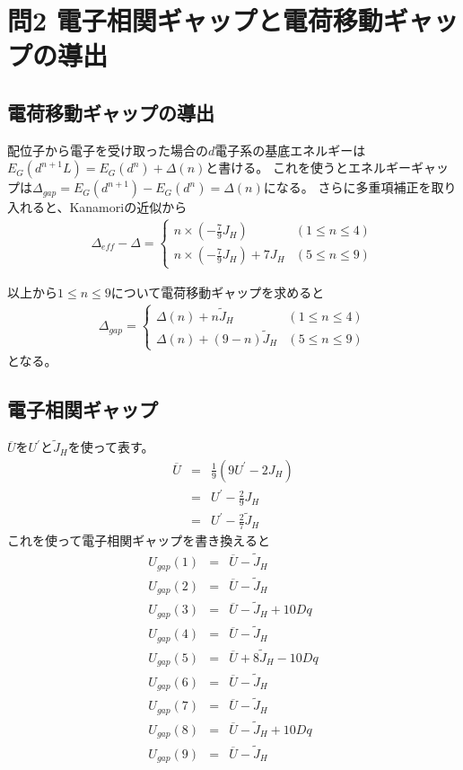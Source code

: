 \documentclass{jsarticle}
\begin{document}
\section{問2 電子相関ギャップと電荷移動ギャップの導出}

\subsection{電荷移動ギャップの導出}
配位子から電子を受け取った場合の$d$電子系の基底エネルギーは$E_G(d^{n+1}L)=E_G(d^n)+\Delta(n)$と書ける。
これを使うとエネルギーギャップは$ \Delta _{gap} = E_G(d^{n+1})-E_G(d^{n})= \Delta (n)$になる。
さらに多重項補正を取り入れると、Kanamoriの近似から
\begin{eqnarray}
  \Delta _{eff} - \Delta
  = \left\{ \begin{array}{ll}
    n \times (- \frac{7}{9} J_H) & (1 \leq n \leq 4) \\
    n \times (- \frac{7}{9} J_H) + 7 J_H & (5 \leq n \leq 9)
  \end{array} \right. \nonumber
\end{eqnarray}

以上から$1 \leq n \leq 9$について電荷移動ギャップを求めると
\begin{eqnarray}
  \Delta _{gap}
  = \left\{ \begin{array}{ll}
    \Delta(n) + n \tilde{J}_H & (1 \leq n \leq 4) \\
    \Delta(n) + (9 - n) \tilde{J}_H & (5 \leq n \leq 9)
  \end{array} \right. \nonumber
\end{eqnarray}
となる。

\subsection{電子相関ギャップ}
$\overline{U}$を$U^{\prime}$と$\tilde{J}_H$を使って表す。
\begin{eqnarray}
  \overline{U} &=& \frac{1}{9} (9U^{\prime} -2J_H) \nonumber \\
  &=& U^{\prime} - \frac{2}{9}J_H \nonumber \\
  &=& U^{\prime} - \frac{2}{7}\tilde{J}_H \nonumber
\end{eqnarray}
これを使って電子相関ギャップを書き換えると
\begin{eqnarray}
  U_{gap}(1) &=& \overline{U} - \tilde{J}_H \nonumber \\
  U_{gap}(2) &=& \overline{U} - \tilde{J}_H \nonumber \\
  U_{gap}(3) &=& \overline{U} - \tilde{J}_H + 10Dq \nonumber \\
  U_{gap}(4) &=& \overline{U} - \tilde{J}_H \nonumber \\
  U_{gap}(5) &=& \overline{U} + 8\tilde{J}_H - 10Dq \nonumber \\
  U_{gap}(6) &=& \overline{U} - \tilde{J}_H \nonumber \\
  U_{gap}(7) &=& \overline{U} - \tilde{J}_H \nonumber \\
  U_{gap}(8) &=& \overline{U} - \tilde{J}_H + 10Dq \nonumber \\
  U_{gap}(9) &=& \overline{U} - \tilde{J}_H \nonumber
\end{eqnarray}
\end{document}
